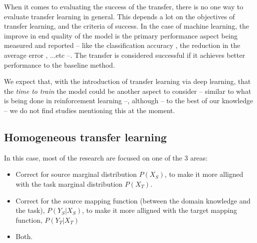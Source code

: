 
  \par When it comes to evaluating the success of the transfer, there is no one way to evaluate transfer learning in general. This depends a lot on the objectives of transfer learning, and the criteria of success. In the case of machine learning, the improve in end quality of the model is the primary performance aspect being measured and reported -- like the classification accuracy \citep{chattopadhyay2012multisource,long2013transfer,pan2010cross,glorot2011domain}, the reduction in the average error \citep{pan2010domain}, ...etc --. The transfer is considered successful if it achieves better performance to the baseline method.

  \par We expect that, with the introduction of transfer learning via deep learning, that the \textit{time to train} the model could be another aspect to consider -- similar to what is being done in reinforcement learning \citep{taylor2007cross} --, although -- to the best of our knowledge -- we do not find studies mentioning this at the moment.

  \subsection{Homogeneous transfer learning}
  \par In this case, most of the research are focused on one of the 3 areas:
  \begin{itemize}
      \item Correct for source marginal distribution $P(X_S)$, to make it more alligned with the task marginal distribution $P(X_T)$.
      \item Correct for the source mapping function (between the domain knowledge and the task), $P(Y_S|X_S)$, to make it more alligned with the target mapping function, $P(Y_T|X_T)$
      \item Both.
  \end{itemize}

